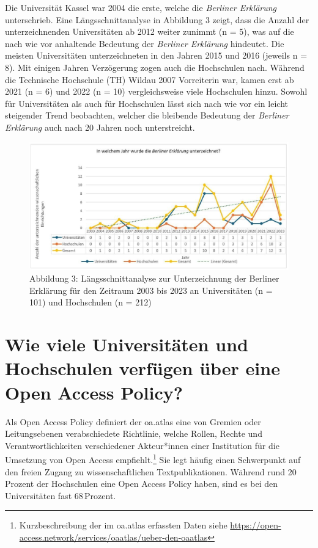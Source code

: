 \documentclass[a4paper,
fontsize=11pt,
oneside,
numbers=noperiodatend,
parskip=half-,
bibliography=totoc,
final
]{scrartcl}
\begin{document}
Die Universität Kassel war 2004 die erste, welche die \emph{Berliner
Erklärung} unterschrieb. Eine Längsschnittanalyse in Abbildung 3 zeigt,
dass die Anzahl der unterzeichnenden Universitäten ab 2012 weiter
zunimmt (n = 5), was auf die nach wie vor anhaltende Bedeutung der
\emph{Berliner Erklärung} hindeutet. Die meisten Universitäten
unterzeichneten in den Jahren 2015 und 2016 (jeweils n = 8). Mit einigen
Jahren Verzögerung zogen auch die Hochschulen nach. Während die
Technische Hochschule (TH) Wildau 2007 Vorreiterin war, kamen erst ab
2021 (n = 6) und 2022 (n = 10) vergleichsweise viele Hochschulen hinzu.
Sowohl für Universitäten als auch für Hochschulen lässt sich nach wie
vor ein leicht steigender Trend beobachten, welcher die bleibende Bedeutung der \emph{Berliner Erklärung} auch nach 20
Jahren noch unterstreicht.

\begin{figure}[H]
\centering
\includegraphics[width=1\textwidth]{img/image003.jpg}
\caption{Abbildung 3: Längsschnittanalyse zur Unterzeichnung der Berliner Erklärung für den Zeitraum 2003 bis 2023 an Universitäten (n = 101) und Hochschulen (n = 212)}
\end{figure}

\section{Wie viele Universitäten und Hochschulen verfügen über
eine Open Access
Policy?}\label{wie-viele-universituxe4ten-und-hochschulen-verfuxfcgen-uxfcber-eine-open-access-policy}

Als Open Access Policy definiert der oa.atlas eine von Gremien oder
Leitungsebenen verabschiedete Richtlinie, welche Rollen, Rechte und
Verantwortlichkeiten verschiedener Akteur*innen einer Institution für
die Umsetzung von Open Access empfiehlt.\footnote{Kurzbeschreibung der
  im oa.atlas erfassten Daten siehe
  \url{https://open-access.network/services/oaatlas/ueber-den-oaatlas}}
Sie legt häufig einen Schwerpunkt auf den freien Zugang zu
wissenschaftlichen Textpublikationen. Während rund 20\,Prozent der
Hochschulen eine Open Access Policy haben, sind es bei den Universitäten
fast 68\,Pro\-zent.
\end{document}
